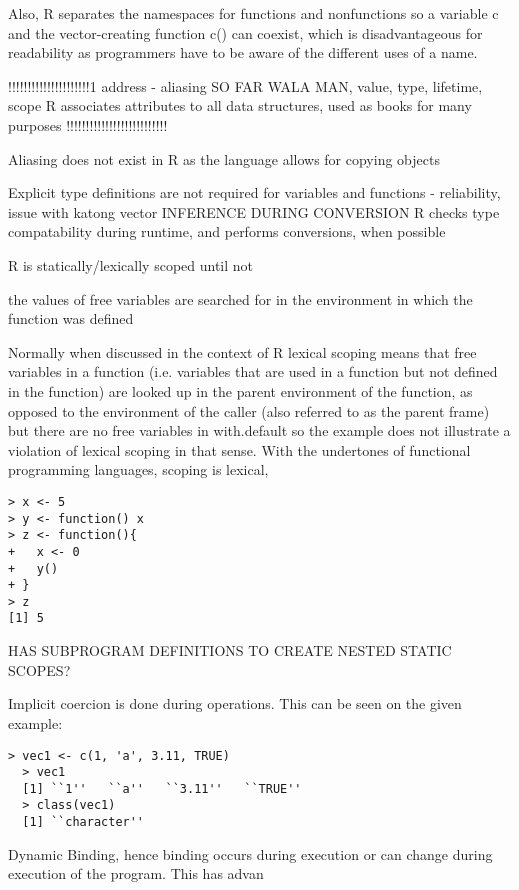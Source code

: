\documentclass[12pt]{article}
\begin{document}
Also, R separates the namespaces for functions and nonfunctions so a variable c and the vector-creating function c() can coexist, which is disadvantageous for readability as programmers have to be aware of the different uses of a name.

!!!!!!!!!!!!!!!!!!!!!1
address - aliasing SO FAR WALA MAN,
value, type, lifetime, scope
  R associates attributes to all data structures, used as books for many purposes
  !!!!!!!!!!!!!!!!!!!!!!!!!!

Aliasing does not exist in R as the language allows for copying objects

Explicit type definitions are not required for variables and functions
- reliability, issue with katong vector
INFERENCE DURING CONVERSION
  R checks type compatability during runtime, and performs conversions, when possible

  R is statically/lexically scoped until not

  the values of free variables are searched for in the environment in which the function was defined


Normally when discussed in the context of R lexical scoping means that free variables in a function (i.e. variables that are used in a function but not defined in the function) are looked up in the parent environment of the function, as opposed to the environment of the caller (also referred to as the parent frame) but there are no free variables in with.default so the example does not illustrate a violation of lexical scoping in that sense.
  With the undertones of functional programming languages, scoping is lexical,

\begin{lstlisting}[frame=single]
> x <- 5
> y <- function() x
> z <- function(){
+   x <- 0
+   y()
+ }
> z
[1] 5
\end{lstlisting}

  HAS SUBPROGRAM DEFINITIONS TO CREATE NESTED STATIC SCOPES?

Implicit coercion is done during operations. This can be seen on the given example:

\begin{lstlisting}[frame=single]
  > vec1 <- c(1, 'a', 3.11, TRUE)
  > vec1
  [1] ``1''   ``a''   ``3.11''   ``TRUE''
  > class(vec1)
  [1] ``character''
\end{lstlisting}

  Dynamic Binding, hence binding occurs during execution or can change during execution of the program. This has advan
\end{document}
